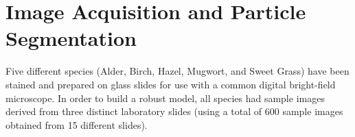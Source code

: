 \section{Image Acquisition and Particle Segmentation}

Five different species (Alder, Birch, Hazel, Mugwort, and Sweet Grass) have been stained and prepared on glass slides for use with a common digital bright-field microscope. In order to build a robust model, all species had sample images derived from three distinct laboratory slides (using a total of 600 sample images obtained from 15 different slides).
 
  
  
  
  
  